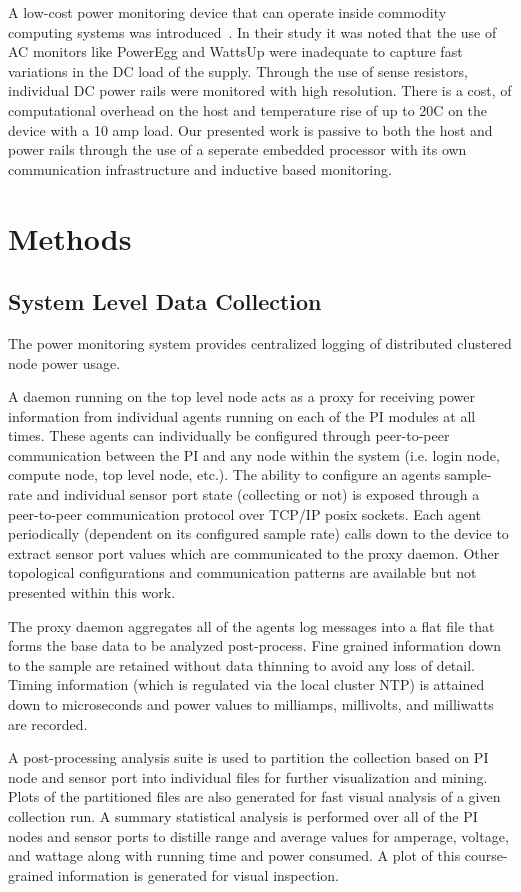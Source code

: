 \documentclass{article}
\begin{document}
A low-cost power monitoring device that can operate inside
commodity computing systems was introduced~\cite{bedard2011}.  In their
study it was noted that the use of AC monitors like PowerEgg and
WattsUp were inadequate to capture fast variations in the DC
load of the supply.  Through the use of sense resistors, individual
DC power rails were monitored with high resolution.  There is
a cost, of computational overhead on the host and temperature
rise of up to 20C on the device with a 10 amp load.  Our
presented work is passive to both the host and power rails
through the use of a seperate embedded processor with its own
communication infrastructure and inductive based monitoring.
\section{Methods}
\subsection{System Level Data Collection}
The power monitoring system provides centralized logging
of distributed clustered node power usage.

A daemon running on the top level node acts as a proxy for
receiving power information from individual agents running
on each of the PI modules at all times.  These agents can
individually be configured through peer-to-peer communication
between the PI and any node within the system (i.e. login node,
compute node, top level node, etc.).  The ability to configure
an agents sample-rate and individual sensor port state
(collecting or not) is exposed through a peer-to-peer
communication protocol over TCP/IP posix sockets.  Each agent
periodically (dependent on its configured sample rate) calls
down to the device to extract sensor port values which are
communicated to the proxy daemon.  Other topological configurations
and communication patterns are available but not presented within
this work.

The proxy daemon aggregates all of the agents log messages into
a flat file that forms the base data to be analyzed post-process.
Fine grained information down to the sample are retained without
data thinning to avoid any loss of detail.  Timing information
(which is regulated via the local cluster NTP) is attained down
to microseconds and power values to milliamps, millivolts, and
milliwatts are recorded.

A post-processing analysis suite is used to partition the
collection based on PI node and sensor port into individual
files for further visualization and mining.  Plots of the
partitioned files are also generated for fast visual analysis
of a given collection run.  A summary statistical analysis is
performed over all of the PI nodes and sensor ports to distille 
range and average values for amperage, voltage, and wattage along
with running time and power consumed.  A plot of this course-grained
information is generated for visual inspection.
\end{document}

